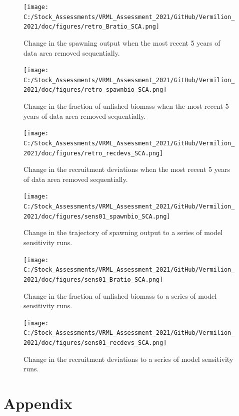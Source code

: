 \documentclass[11pt,
  english,
  a4paper,
]{article}
\begin{document}
\begin{figure}
\centering
\texttt{[image: C:/Stock\_Assessments/VRML\_Assessment\_2021/GitHub/Vermilion\_2021/doc/figures/retro\_Bratio\_SCA.png]}
\caption{Change in the spawning output when the most recent 5 years of data area removed sequentially.\label{fig:retro-spawnb}}
\end{figure}

\begin{figure}
\centering
\texttt{[image: C:/Stock\_Assessments/VRML\_Assessment\_2021/GitHub/Vermilion\_2021/doc/figures/retro\_spawnbio\_SCA.png]}
\caption{Change in the fraction of unfished biomass when the most recent 5 years of data area removed sequentially.\label{fig:retro-bratio}}
\end{figure}

\begin{figure}
\centering
\texttt{[image: C:/Stock\_Assessments/VRML\_Assessment\_2021/GitHub/Vermilion\_2021/doc/figures/retro\_recdevs\_SCA.png]}
\caption{Change in the recruitment deviations when the most recent 5 years of data area removed sequentially.\label{fig:retro-recdev}}
\end{figure}

\begin{figure}
\centering
\texttt{[image: C:/Stock\_Assessments/VRML\_Assessment\_2021/GitHub/Vermilion\_2021/doc/figures/sens01\_spawnbio\_SCA.png]}
\caption{Change in the trajectory of spawning output to a series of model sensitivity runs.\label{fig:sens1-spawnb}}
\end{figure}

\begin{figure}
\centering
\texttt{[image: C:/Stock\_Assessments/VRML\_Assessment\_2021/GitHub/Vermilion\_2021/doc/figures/sens01\_Bratio\_SCA.png]}
\caption{Change in the fraction of unfished biomass to a series of model sensitivity runs.\label{fig:sens1-bratio}}
\end{figure}

\begin{figure}
\centering
\texttt{[image: C:/Stock\_Assessments/VRML\_Assessment\_2021/GitHub/Vermilion\_2021/doc/figures/sens01\_recdevs\_SCA.png]}
\caption{Change in the recruitment deviations to a series of model sensitivity runs.\label{fig:sens1-recdev}}
\end{figure}

\clearpage


\hypertarget{appendix}{%
\section{Appendix}\label{appendix}}
\end{document}
